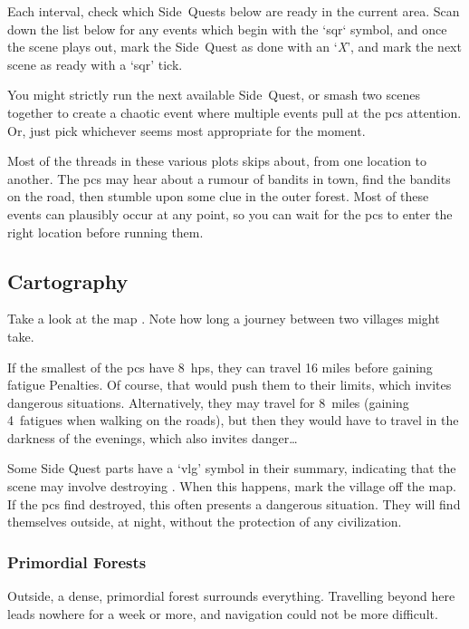 \begin{multicols}{2}

\noindent
Each \gls{interval}, check which Side~Quests below are ready in the current area.%
Scan down the list below for any events which begin with the `\gls{sqr}` symbol, and once the scene plays out, mark the Side~Quest as done with an `\textit{X}', and mark the next scene as ready with a `\gls{sqr}' tick.

You might strictly run the next available Side~Quest, or smash two scenes together to create a chaotic event where multiple events pull at the \glspl{pc} attention.
Or, just pick whichever seems most appropriate for the moment.

Most of the threads in these various plots skips about, from one location to another.
The \glspl{pc} may hear about a rumour of bandits in town, find the bandits on the road, then stumble upon some clue in the outer forest.
Most of these events can plausibly occur at any point, so you can wait for the \glspl{pc} to enter the right location before running them.

\subsection{Cartography}

Take a look at the map .
Note how long a journey between two \glspl{village} might take.

If the smallest of the \glspl{pc} have 8~\glspl{hp}, they can travel 16 miles before gaining \gls{fatigue} Penalties.
Of course, that would push them to their limits, which invites dangerous situations.
Alternatively, they may travel for 8~miles (gaining 4~\glspl{fatigue} when walking on the roads), but then they would have to travel in the darkness of the evenings, which also invites danger\ldots

Some Side Quest parts have a `\gls{vlg}' symbol in their summary, indicating that the scene may involve destroying .
When this happens, mark the \gls{village} off the map.
If the \glspl{pc} find  destroyed, this often presents a dangerous situation.
They will find themselves outside, at night, without the protection of any civilization.

\subsubsection{Primordial Forests}
Outside, a dense, primordial forest surrounds everything.
Travelling beyond here leads nowhere for a week or more, and navigation could not be more difficult.


\end{multicols}
